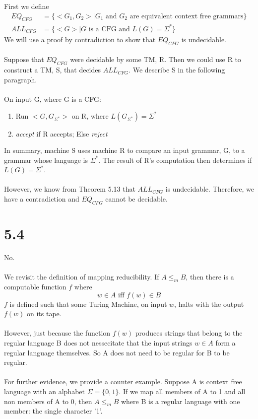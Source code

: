 \documentclass{article}
\begin{document}
First we define
\begin{align*}
    EQ_{CFG} &= \{ <G_1, G_2> | G_1 \textrm{ and } G_2 \textrm{ are equivalent context free grammars} \}\\
    ALL_{CFG} &= \{ <G> | G \textrm{ is a CFG and } L(G) = \Sigma^* \} 
\end{align*} 
We will use a proof by contradiction to show that $EQ_{CFG}$ is undecidable.\\\\
Suppose that $EQ_{CFG}$ were decidable by some TM, R. Then we could use R to construct a TM, S, that decides $ALL_{CFG}$. We describe S in the following paragraph.\\\\
On input G, where G is a CFG:
\begin{enumerate}
    \item Run $<G, G_{\Sigma^*}>$ on R, where $L(G_{\Sigma^*}) = \Sigma^*$
    \item \textit{accept} if R accepts; Else \textit{reject}
\end{enumerate}
In summary, machine S uses machine R to compare an input grammar, G, to a grammar whose language is $\Sigma^*$. The result of R's computation then determines if $L(G) = \Sigma^*$.\\\\
However, we know from Theorem 5.13 that $ALL_{CFG}$ is undecidable. Therefore, we have a contradiction and $EQ_{CFG}$ cannot be decidable.

\section*{5.4}

No.\\\\
We revisit the definition of mapping reducibility. If $A \leq_m B$, then there is a computable function $f$ where
$$w \in A \textrm{  iff   } f(w) \in B$$
$f$ is defined such that some Turing Machine, on input $w$, halts with the output $f(w)$ on its tape. \\\\
However, just because the function $f(w)$ produces strings that belong to the regular language B does not nessecitate that the input strings $w \in A$ form a regular language themselves. So A does not need to be regular for B to be regular.\\\\
For further evidence, we provide a counter example. Suppose A is context free language with an alphabet $\Sigma=\{0,1\}$. If we map all members of A to 1 and all non members of A to 0, then $A \leq_m B$ where B is a regular language with one member: the single character '1'.
\end{document}
